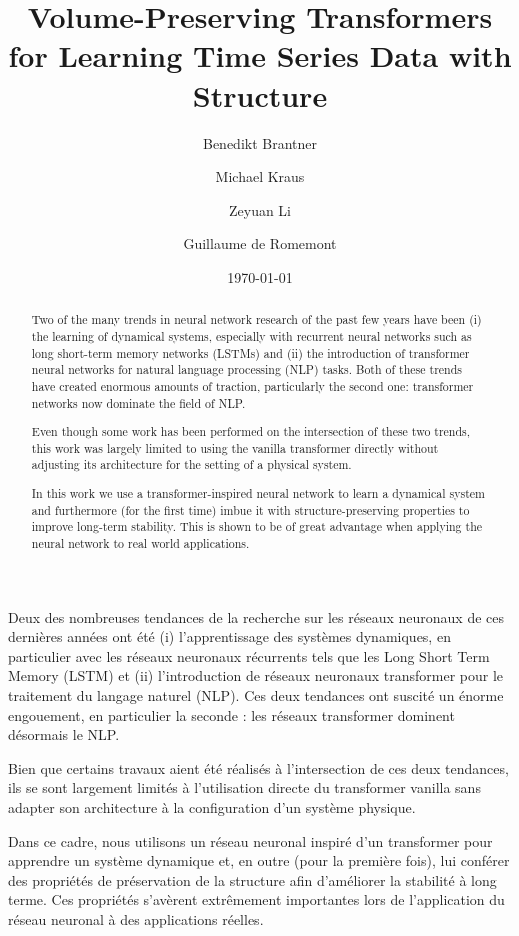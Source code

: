\documentclass[proc]{edpsmath}
\begin{document}
\title{Volume-Preserving Transformers for Learning Time Series Data with Structure}%
%
\author{Benedikt Brantner}\address{Max-Planck-Institut f\"ur Plasmaphysik, Boltzmannstra\ss{}e 2, 85748 Garching}
\author{Michael Kraus} %
\author{Zeyuan Li}\address{Zentrum Mathematik, Technische Universität München, Boltzmannstra\ss{}e 3, 85748 Garching, Germany}
\author{Guillaume de Romemont} \address{DAAA, ONERA, Université Paris Saclay, F-92322, Châtillon, France}
%
\date{\today}

\begin{abstract} 
    Two of the many trends in neural network research of the past few years have been (i) the learning of dynamical systems, especially with recurrent neural networks such as long short-term memory networks (LSTMs) and (ii) the introduction of transformer neural networks for natural language processing (NLP) tasks. Both of these trends have created enormous amounts of traction, particularly the second one: transformer networks now dominate the field of NLP. 

    Even though some work has been performed on the intersection of these two trends, this work was largely limited to using the vanilla transformer directly without adjusting its architecture for the setting of a physical system.

    In this work we use a transformer-inspired neural network to learn a dynamical system and furthermore (for the first time) imbue it with structure-preserving properties to improve long-term stability. This is shown to be of great advantage when applying the neural network to real world applications.
\end{abstract}
%
\begin{resume} 
    Deux des nombreuses tendances de la recherche sur les réseaux neuronaux de ces dernières années ont été (i) l'apprentissage des systèmes dynamiques, en particulier avec les réseaux neuronaux récurrents tels que les Long Short Term Memory (LSTM) et (ii) l'introduction de réseaux neuronaux transformer pour le traitement du langage naturel (NLP). Ces deux tendances ont suscité un énorme engouement, en particulier la seconde : les réseaux transformer dominent désormais le NLP. 

    Bien que certains travaux aient été réalisés à l'intersection de ces deux tendances, ils se sont largement limités à l'utilisation directe du transformer vanilla sans adapter son architecture à la configuration d'un système physique.
    
    Dans ce cadre, nous utilisons un réseau neuronal inspiré d'un transformer pour apprendre un système dynamique et, en outre (pour la première fois), lui conférer des propriétés de préservation de la structure afin d'améliorer la stabilité à long terme. Ces propriétés s'avèrent extrêmement importantes lors de l'application du réseau neuronal à des applications réelles.
    
\end{resume}
\end{document}

